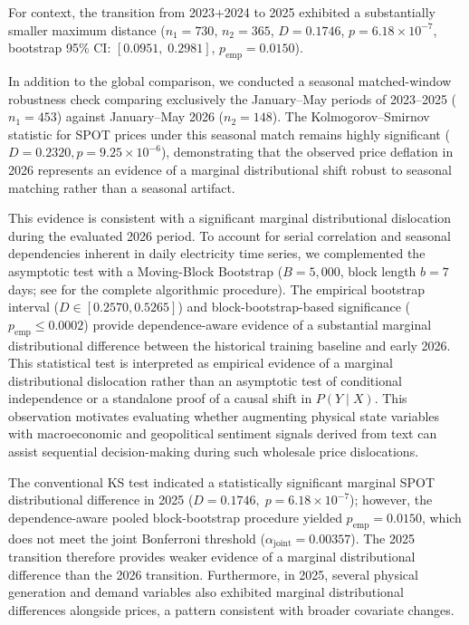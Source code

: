 For context, the transition from 2023+2024 to 2025 exhibited a substantially smaller maximum distance ($n_1 = 730$, $n_2 = 365$, $D = 0.1746$, $p = 6.18 \times 10^{-7}$, bootstrap 95\% CI: $[0.0951,\; 0.2981]$, $p_{\text{emp}} = 0.0150$).

In addition to the global comparison, we conducted a seasonal matched-window robustness check comparing exclusively the January--May periods of 2023--2025 ($n_1 = 453$) against January--May 2026 ($n_2 = 148$). The Kolmogorov--Smirnov statistic for SPOT prices under this seasonal match remains highly significant ($D = 0.2320, p = 9.25 \times 10^{-6}$), demonstrating that the observed price deflation in 2026 represents an evidence of a marginal distributional shift robust to seasonal matching rather than a seasonal artifact.

This evidence is consistent with a significant marginal distributional dislocation during the evaluated 2026 period. To account for serial correlation and seasonal dependencies inherent in daily electricity time series, we complemented the asymptotic test with a Moving-Block Bootstrap ($B = 5{,}000$, block length $b = 7$ days; see  for the complete algorithmic procedure). The empirical bootstrap interval ($D \in [0.2570, 0.5265]$) and block-bootstrap-based significance ($p_{\text{emp}} \le 0.0002$) provide dependence-aware evidence of a substantial marginal distributional difference between the historical training baseline and early 2026. This statistical test is interpreted as empirical evidence of a marginal distributional dislocation rather than an asymptotic test of conditional independence or a standalone proof of a causal shift in $P(Y \mid X)$. This observation motivates evaluating whether augmenting physical state variables with macroeconomic and geopolitical sentiment signals derived from text can assist sequential decision-making during such wholesale price dislocations.

The conventional KS test indicated a statistically significant marginal SPOT distributional difference in 2025 ($D = 0.1746,\; p = 6.18 \times 10^{-7}$); however, the dependence-aware pooled block-bootstrap procedure yielded $p_{\text{emp}} = 0.0150$, which does not meet the joint Bonferroni threshold ($\alpha_{\text{joint}} = 0.00357$). The 2025 transition therefore provides weaker evidence of a marginal distributional difference than the 2026 transition. Furthermore, in 2025, several physical generation and demand variables also exhibited marginal distributional differences alongside prices, a pattern consistent with broader covariate changes.
